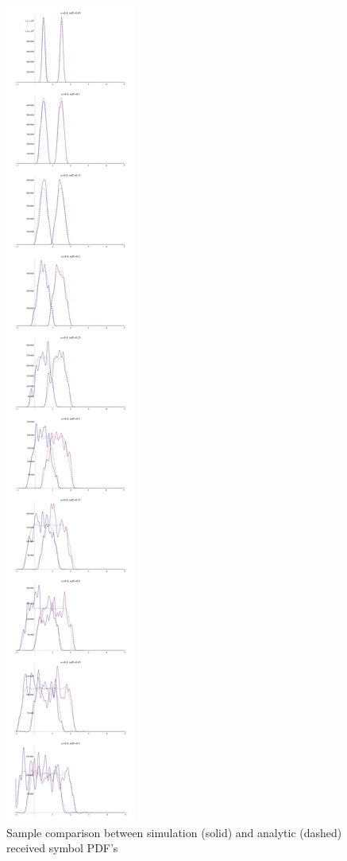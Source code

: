 \begin{figure}[htbp]
\centering
\includegraphics{../plots/comparison_f08.png}
\caption{Sample comparison between simulation (solid) and analytic
(dashed) received symbol PDF's}
\end{figure}

